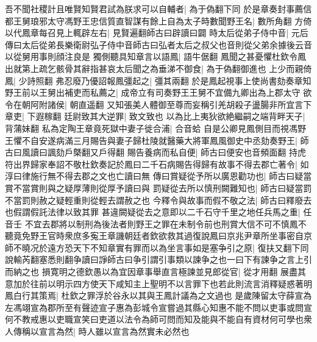 吾不聞社稷計且唯賢知賢君試為朕求可以自輔者|{
	為于偽翻下同}
於是章奏封事薦信都王舅琅邪太守馮野王忠信質直智謀有餘上自為太子時數聞野王名|{
	數所角翻}
方倚以代鳳章每召見上輒辟左右|{
	見賢遍翻師古曰辟讀曰闢}
時太后從弟子侍中音|{
	元后傳曰太后從弟長樂衛尉弘子侍中音師古曰弘者太后之叔父也音則從父弟余據後云音以從舅用事則顔注良是}
獨側聽具知章言以語鳳|{
	語牛倨翻}
鳳聞之甚憂懼杜欽令鳳出就第上疏乞骸骨其辭指甚哀太后聞之為垂涕不御食|{
	為于偽翻御進也}
上少而親倚鳳|{
	少詩照翻}
弗忍廢乃優詔報鳳彊起之|{
	彊其兩翻}
於是鳳起視事上使尚書劾奏章知野王前以王舅出補吏而私薦之|{
	成帝立有司奏野王王舅不宜備九卿出為上郡太守}
欲令在朝阿附諸侯|{
	朝直遥翻}
又知張美人體御至尊而妄稱引羌胡殺子盪腸非所宜言下章吏|{
	下遐稼翻}
廷尉致其大逆罪|{
	致文致也}
以為比上夷狄欲絶繼嗣之端背畔天子|{
	背蒲妹翻}
私為定陶王章竟死獄中妻子徙合浦|{
	合音蛤}
自是公卿見鳳側目而視馮野王懼不自安遂病滿三月賜告與妻子歸杜陵就醫藥大將軍鳳風御史中丞劾奏野王|{
	師古曰風讀曰諷劾戶槩翻又戶得翻}
賜告養病而私自便|{
	師古曰便安也音頻面翻}
持虎符出界歸家奉詔不敬杜欽奏記於鳳曰二千石病賜告得歸有故事不得去郡亡著令|{
	如淳曰律施行無不得去郡之文也亡讀曰無}
傳曰賞疑從予所以廣恩勸功也|{
	師古曰疑當賞不當賞則與之疑厚薄則從厚予讀曰與}
罰疑從去所以慎刑闕難知也|{
	師古曰疑當罰不當罰則赦之疑輕重則從輕去謂赦之也}
今釋令與故事而假不敬之法|{
	師古曰釋廢去也假謂假託法律以致其罪}
甚違闕疑從去之意即以二千石守千里之地任兵馬之重|{
	任音壬}
不宜去郡將以制刑為後法者則野王之罪在未制令前也刑賞大信不可不慎鳳不聽竟免野王官時衆庶多寃王章譏朝廷者欽欲救其過復說鳳曰京兆尹章所坐事密自京師不曉况於遠方恐天下不知章實有罪而以為坐言事如是塞争引之原|{
	復扶又翻下同說輸芮翻塞悉則翻争讀曰諍師古曰争引謂引事類以諫争之也一曰下有諫争之言上引而納之也}
損寛明之德欽愚以為宜因章事舉直言極諫並見郎從官|{
	從才用翻}
展盡其意加於往前以明示四方使天下咸知主上聖明不以言罪下也若此則流言消釋疑惑著明鳳白行其策焉|{
	杜欽之罪浮於谷永以其與王鳳計議為之文過也}
是歲陳留太守薛宣為左馮翊宣為郡所至有聲迹宣子惠為彭城令宣嘗過其縣心知惠不能不問以吏事或問宣何不教戒惠以吏職宣笑曰吏道以法令為師可問而知及能與不能自有資材何可學也衆人傳稱以宣言為然|{
	時人雖以宣言為然實未必然也}


